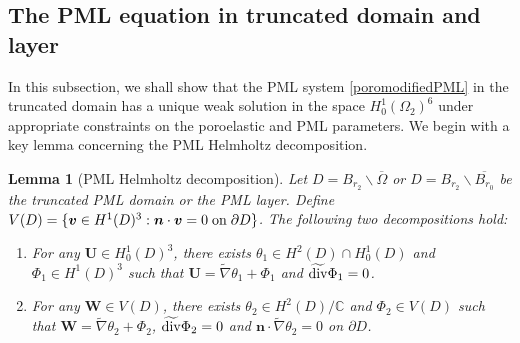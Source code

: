 \documentclass[11pt]{article}
\newcommand{\ba}{\backslash}
\newcommand{\pa}{\partial}
\newcommand{\ov}{\overline}
\newcommand{\dive}{{\rm div}}
\newcommand{\Om}{\Omega}
\newcommand{\wid}{\widetilde}
\newcommand{\bs}{\boldsymbol}
\newtheorem{lemma}[theorem]{Lemma}
\begin{document}
\subsection{The PML equation in truncated domain and layer}\label{subsec:PML equation}
\setcounter{equation}{0}
In this subsection, we shall show that the PML system \eqref{poromodifiedPML} in the truncated domain
has a unique weak solution in the space $H_0^1( \Om_2)^6$ under appropriate constraints 
on the poroelastic and PML parameters. We begin with a key lemma concerning the PML Helmholtz decomposition.
\begin{lemma}[PML Helmholtz decomposition]\label{PMLHD}
Let $D=B_{r_2}\ba\ov{\Om}$ or $D=B_{r_2}\ba\ov{B_{r_0}}$ be the truncated PML domain or the PML layer.
Define $V(D)=\{\bs{v}\in H^1(D)^3:\bs{n} \cdot\bs{v} =0 \;{\rm on}\;\pa D\}
$. The following two decompositions hold:
\begin{enumerate}
\item[(1)] For any $\bs{U}\in H_0^1(D)^3$, there exists $\theta_1 \in H^2(D)\cap H_0^1(D)$ and $\Phi_1\in H^1(D)^3$ 
such that $\bs{U}= \wid{\nabla}\theta_1 +\Phi_1$ and $\wid{\dive}\Phi_1=0$.
\item[(2)] For any $\bs{W}\in V(D)$, there exists $\theta_2 \in H^2(D)/\mathbb{C}$ and $\Phi_2\in V(D)$ such that 
$\bs{W}= \wid{\nabla}\theta_2 +\Phi_2$, $\wid{\dive}\Phi_2=0$ and $\bs{n}\cdot\wid{\nabla}\theta_2=0$ on $\pa D$.
\end{enumerate}
\end{lemma}
\end{document}
